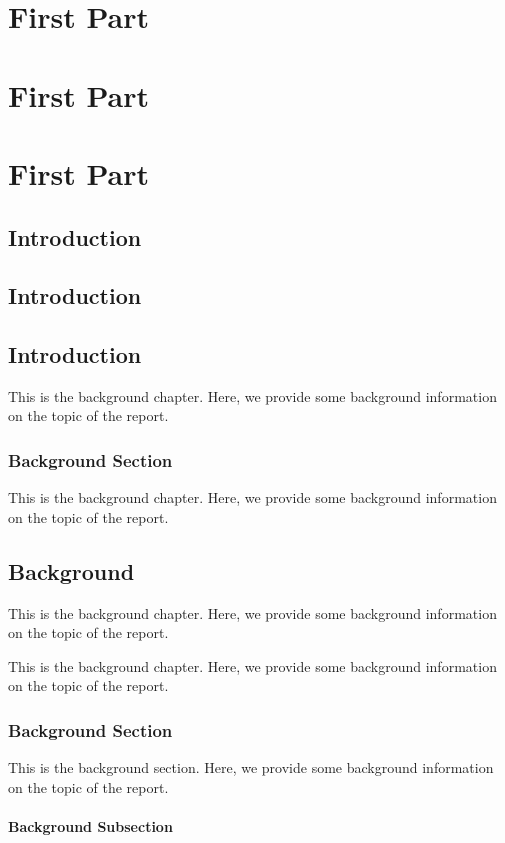 \documentclass{report}
\begin{document}
\part{First Part}
\part{First Part}
\part{First Part}
\chapter{Introduction}
\chapter{Introduction}

\chapter{Introduction}
This is the background chapter. Here, we provide some background information on
the topic of the report.
\section{Background Section}

This is the background chapter. Here, we provide some background information on
the topic of the report.
\chapter{Background}
This is the background chapter. Here, we provide some background information on
the topic of the report.

This is the background chapter. Here, we provide some background information on
the topic of the report.

\section{Background Section}
This is the background section. Here, we provide some background information on
the topic of the report.

\subsection{Background Subsection}
\end{document}
